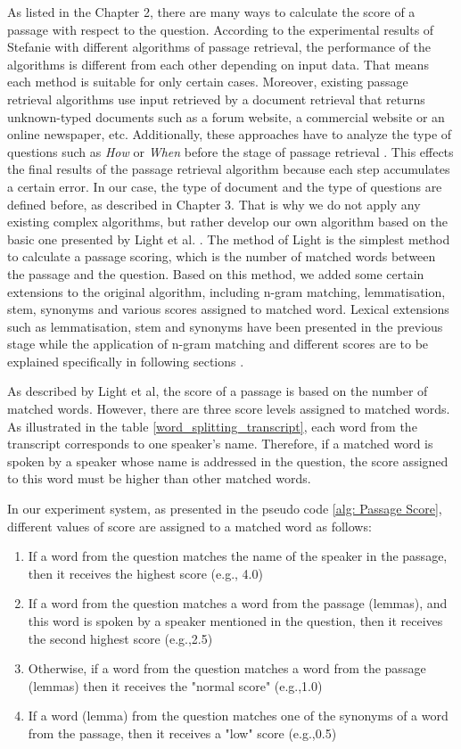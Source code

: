 As listed in the Chapter 2, there are many ways to calculate the score of a passage with respect to the question. According to the experimental results of Stefanie \cite{tellex2003qep} with different algorithms of passage retrieval, the performance of the algorithms is different from each other depending on input data. That means each method is suitable for only certain cases. Moreover, existing passage retrieval algorithms use input retrieved by a document retrieval that returns unknown-typed documents such as a forum website, a commercial website or an online newspaper, etc. Additionally, these approaches have to analyze the type of questions such as \textit{How} or \textit{When} before the stage of passage retrieval  \cite{TREC8, TREC2001, hirschman2002nlq, tellex2003qep}. This effects the final results of the passage retrieval algorithm because each step accumulates a certain error. In our case, the type of document and the type of questions are defined before, as described in Chapter 3. That is why we do not apply any existing complex algorithms, but rather develop our own algorithm based on the basic one presented by Light et al. \cite{light2002aec}. The method of Light is the simplest method to calculate a passage scoring, which is the number of matched words between the passage and the question. Based on this method, we added some certain extensions to the original algorithm, including n-gram matching, lemmatisation, stem, synonyms and various scores assigned to matched word. Lexical extensions such as lemmatisation, stem and synonyms have been presented in the previous stage while the application of n-gram matching and different scores are to be explained specifically in following sections \cite{lequocanh1}.

As described by Light et al, the score of a passage is based on the number of matched words. However, there are three score levels assigned to matched words. As illustrated in the table \ref{word_splitting_transcript}, each word from the transcript corresponds to one speaker's name. Therefore, if a matched word is spoken by a speaker whose name is addressed in the question, the score assigned to this word must be higher than other matched words. 

In our experiment system, as presented in the pseudo code \ref{alg: Passage Score}, different values of score are assigned to a matched word as follows: 
\begin{enumerate}
\item {If a word from the question matches the name of the speaker in the passage, then it receives the highest score (e.g., 4.0)}
\item {If a word from the question matches a word from the passage (lemmas), and this word is spoken by a speaker mentioned in the question, then it receives the second highest score (e.g.,2.5)}
\item{Otherwise, if a word from the question matches a word from the passage (lemmas) then it receives the "normal score" (e.g.,1.0)}
\item{If a word (lemma) from the question matches one of the synonyms of a word from the passage, then it receives a "low" score (e.g.,0.5)}
\end{enumerate}

